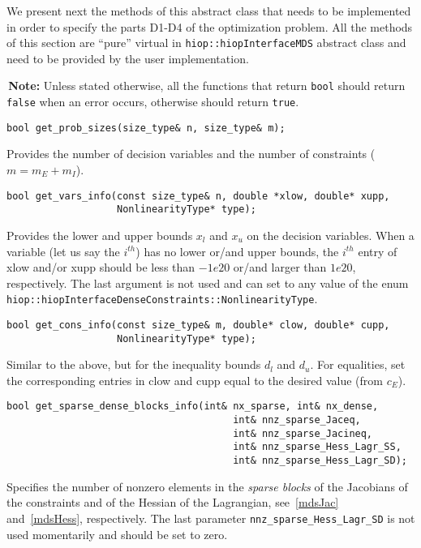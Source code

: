 \documentclass[11pt]{article}
\newcounter{line}
\newcommand{\warningSymbol}{\raisebox{0.9\depth}{\danger}}
\newcommand{\warningcp}[1]{%
        \smallskip \noindent \textcolor{warningColorText}{\warningSymbol{}}\,\textbf{#1} %
    }
\begin{document}
 We present next the methods of this abstract class that needs to be implemented in order to specify the parts D1-D4 of the optimization problem. All the methods of this section are ``pure'' virtual in \texttt{hiop::hiopInterfaceMDS} abstract class  and need to be provided by the user implementation.
 
 

\warningcp{Note:} Unless stated otherwise, all the functions that return \texttt{bool} should return \texttt{false} when an error occurs, otherwise should return \texttt{true}.

\begin{lstlisting} 
bool get_prob_sizes(size_type& n, size_type& m);
\end{lstlisting} 
\noindent Provides the number of decision variables and the number of constraints ($m=m_E+m_I$).


\begin{lstlisting} 
bool get_vars_info(const size_type& n, double *xlow, double* xupp, 
                   NonlinearityType* type);
\end{lstlisting} 

\noindent Provides the lower and upper bounds $x_l$ and $x_u$ on the decision variables. When a variable (let us say the $i^{th}$) has no lower or/and upper bounds, the  $i^{th}$ entry of xlow and/or xupp should be less than $-1e20$ or/and larger than $1e20$, respectively. The last argument is not used and can set to any value of the enum \texttt{hiop::hiopInterfaceDenseConstraints::NonlinearityType}.


\begin{lstlisting} 
bool get_cons_info(const size_type& m, double* clow, double* cupp, 
                   NonlinearityType* type);
\end{lstlisting}
\noindent Similar to the above, but for the inequality bounds $d_l$ and $d_u$. For equalities, set the corresponding entries in clow and cupp equal to the desired value (from $c_E$).

\begin{lstlisting} 
bool get_sparse_dense_blocks_info(int& nx_sparse, int& nx_dense,
					                   int& nnz_sparse_Jaceq, 
					                   int& nnz_sparse_Jacineq,
					                   int& nnz_sparse_Hess_Lagr_SS, 
					                   int& nnz_sparse_Hess_Lagr_SD);
\end{lstlisting}
\noindent Specifies the number of nonzero elements in the  \textit{sparse blocks} of the Jacobians of the constraints and of the Hessian of the Lagrangian, see~\eqref{mdsJac} and~\eqref{mdsHess}, respectively. The last parameter \texttt{nnz\_sparse\_Hess\_Lagr\_SD} is not used momentarily and should be set to zero.
\end{document}
